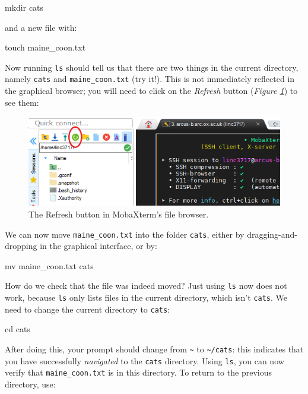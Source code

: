 \documentclass[10pt]{article}
\newcommand{\figref}[1]{\textit{Figure \ref{fig:#1}}}
\begin{document}
\begin{cmdline}
mkdir cats
\end{cmdline}

and a new file with:

\begin{cmdline}
touch maine_coon.txt
\end{cmdline}

Now running \texttt{ls} should tell us that there are two things in the current directory, namely \texttt{cats} and \texttt{maine\_coon.txt} (try it!). This is not immediately reflected in the graphical browser; you will need to click on the \textit{Refresh} button (\figref{refresh}) to see them:

\begin{figure}[H]
    \centering
    \includegraphics[scale=0.6]{./img/refresh}
    \caption{The Refresh button in MobaXterm's file browser.}
    \label{fig:refresh}
\end{figure}

We can now move \texttt{maine\_coon.txt} into the folder \texttt{cats}, either by dragging-and-dropping in the graphical interface, or by:

\begin{cmdline}
mv maine_coon.txt cats
\end{cmdline}

How do we check that the file was indeed moved? Just using \texttt{ls} now does not work, because \texttt{ls} only lists files in the current directory, which isn't \texttt{cats}. We need to change the current directory to \texttt{cats}:

\begin{cmdline}
cd cats
\end{cmdline}

After doing this, your prompt should change from \texttt{\textasciitilde} to \texttt{\textasciitilde /cats}: this indicates that you have successfully \textit{navigated} to the \texttt{cats} directory. Using \texttt{ls}, you can now verify that \texttt{maine\_coon.txt} is in this directory. To return to the previous directory, use:
\end{document}
